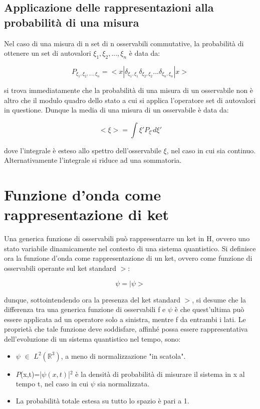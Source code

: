 \documentclass{article}
\begin{document}
\subsection{Applicazione delle rappresentazioni alla probabilità di una misura}
Nel caso di una misura di n set di n osservabili commutative, la probabilità di ottenere un set di autovalori $\xi_1,\xi_2,...,\xi_n$ è data da:

\begin{equation}
    P_{\xi_1,\xi_2,...,\xi_n} = <x|\delta_{\xi_1,\xi_1}\delta_{\xi_2,\xi_2}...\delta_{\xi_n,\xi_n}|x>
\end{equation}

si trova immediatamente che la probabilità di una misura di un osservabile non è altro che il modulo quadro dello stato a cui si applica l'operatore set di autovalori in questione.
Dunque la media di una misura di un osservabile è data da:

\begin{equation}
    <\xi> = \int \xi' P_{\xi'}d\xi'
\end{equation}

dove l'integrale è esteso allo spettro dell'osservabile $\xi$, nel caso in cui sia continuo. Alternativamente l'integrale si riduce ad una sommatoria.


\section{Funzione d'onda come rappresentazione di ket}
Una generica funzione di osservabili può rappresentarre un ket in H, ovvero uno stato variabile dinamicamente nel contesto di una sistema quantistico.
Si definisce ora la funzione d'onda come rappresentazione di un ket, ovvero come funzione di osservabili operante sul ket standard $>$:

\begin{equation}
    \psi = |\psi>
\end{equation}

dunque, sottointendendo ora la presenza del ket standard $>$, si desume che la differenza tra una generica funzione di osservabili f e $\psi$ è che
quest'ultima può essere applicata ad un operatore solo a sinistra, mentre f da entrambi i lati.
Le proprietà che tale funzione deve soddisfare, affinhé possa essere rappresentativa dell'evoluzione di un
sistema quantistico nel tempo, sono:

\begin{itemize}
    \item $\psi$ $\in$ $L^2(\mathbb{R}^3)$, a meno di normalizzazione "in scatola".
    \item $P$(x,t)=|$\psi(x,t)$|$^2$ è la densità di probabilità di misurare il sistema in x al tempo t, nel caso in cui $\psi$ sia normalizzata.
    \item La probabilità totale estesa su tutto lo spazio è pari a 1.
\end{itemize}
\end{document}
